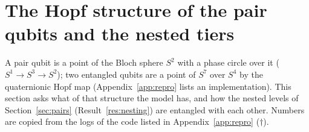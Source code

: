 \documentclass[11pt]{article}
\theoremstyle{definition}
\begin{document}
\section{The Hopf structure of the pair qubits and the nested tiers}\label{sec:hopf}
A pair qubit is a point of the Bloch sphere $S^2$ with a phase circle over it ($S^1\to S^3\to S^2$); two entangled qubits are a point of $S^7$ over $S^4$ by the quaternionic Hopf map (Appendix~\ref{app:repro} lists an implementation). This section asks what of that structure the model has, and how the nested levels of Section~\ref{sec:pairs} (Result~\ref{res:nesting}) are entangled with each other. Numbers are copied from the logs of the code listed in Appendix~\ref{app:repro} ($\dagger$).
\end{document}

